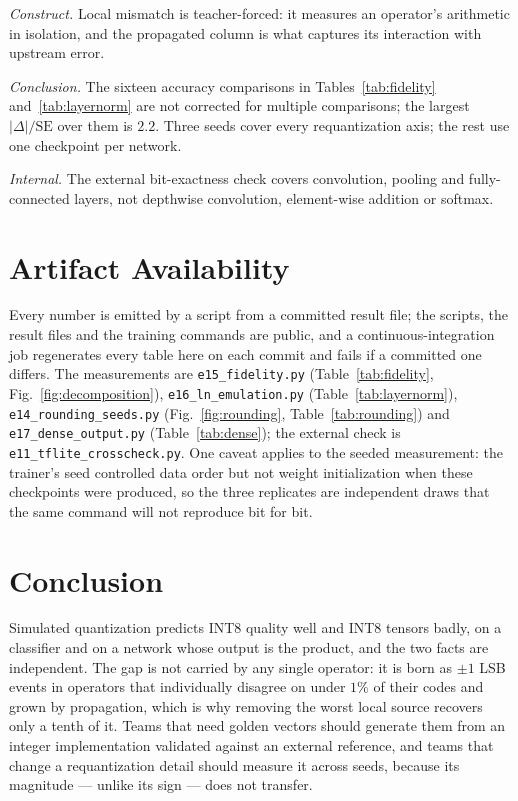 \documentclass[journal]{IEEEtran}
\begin{document}
\emph{Construct.} Local mismatch is teacher-forced: it measures an operator's arithmetic in isolation, and the
propagated column is what captures its interaction with upstream error.

\emph{Conclusion.} The sixteen accuracy comparisons in Tables~\ref{tab:fidelity} and~\ref{tab:layernorm} are
not corrected for multiple comparisons; the largest $|\Delta|/\mathrm{SE}$ over them is $2.2$. Three seeds
cover every requantization axis; the rest use one checkpoint per network.

\emph{Internal.} The external bit-exactness check covers convolution, pooling and fully-connected layers, not
depthwise convolution, element-wise addition or softmax.

\section{Artifact Availability}
Every number is emitted by a script from a committed result file; the scripts, the result files and the
training commands are public, and a continuous-integration job regenerates every table here on each commit and
fails if a committed one differs. The measurements are
\texttt{e15\_fidelity.py} (Table~\ref{tab:fidelity}, Fig.~\ref{fig:decomposition}),
\texttt{e16\_ln\_emulation.py} (Table~\ref{tab:layernorm}), \texttt{e14\_rounding\_seeds.py}
(Fig.~\ref{fig:rounding}, Table~\ref{tab:rounding}) and \texttt{e17\_dense\_output.py} (Table~\ref{tab:dense});
the external check is \texttt{e11\_tflite\_crosscheck.py}.
One caveat applies to the seeded measurement: the trainer's seed controlled data order but not weight
initialization when these checkpoints were produced, so the three replicates are independent draws that the
same command will not reproduce bit for bit.

\section{Conclusion}
Simulated quantization predicts INT8 quality well and INT8 tensors badly, on a classifier and on a network
whose output is the product, and the two facts are independent. The gap is not carried by any single operator:
it is born as $\pm 1$ LSB events in operators that individually disagree on under $1\%$ of their codes and grown
by propagation, which is why removing the worst local source recovers only a tenth of it. Teams that need golden
vectors should generate them from an integer implementation validated against an external reference, and teams
that change a requantization detail should measure it across seeds, because its magnitude --- unlike its sign
--- does not transfer.
\end{document}
